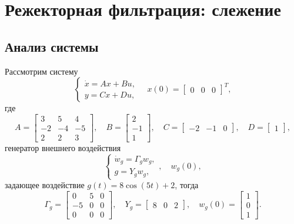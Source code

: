 \section{Режекторная фильтрация: слежение}

\subsection{Анализ системы}

Рассмотрим систему
\begin{equation}
    \label{eq:sys}
    \begin{cases}
        \dot x = Ax+Bu,\\
        y=Cx+Du,
    \end{cases}\quad x(0)=\begin{bmatrix}
        0&0&0
    \end{bmatrix}^T,
\end{equation}
где
\begin{equation*}
    A=\begin{bmatrix}
        3 & 5 & 4 \\
        -2 & -4 & -5 \\
        2 & 2 & 3
    \end{bmatrix},\quad
    B=\begin{bmatrix}
        2 \\ -1 \\ 1
    \end{bmatrix},\quad
    C=\begin{bmatrix}
        -2&-1&0
    \end{bmatrix},\quad
    D=\begin{bmatrix}
        1
    \end{bmatrix},
\end{equation*}
генератор внешнего воздействия
\begin{equation}
    \label{eq:sys_g}
    \begin{cases}
        \dot w_g=\Gamma_gw_g,\\
        g=Y_gw_g,
    \end{cases},\quad w_g(0),
\end{equation}
задающее воздействие $g(t)=8\cos(5t)+2$,  тогда
\begin{equation*}
    \Gamma_g=\begin{bmatrix}
        0 & 5 & 0 \\
        -5& 0 & 0 \\
        0 & 0 & 0
    \end{bmatrix},\quad
    Y_g=\begin{bmatrix}
        8 & 0 & 2
    \end{bmatrix},\quad
    w_g(0)=\begin{bmatrix}
        1 \\ 0 \\ 1
    \end{bmatrix}.
\end{equation*}
